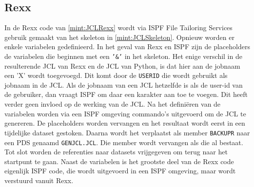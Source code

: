 \subsection{Rexx}
In de Rexx code van \ref{mint:JCLRexx} wordt via ISPF File Tailoring Services gebruik gemaakt van het skeleton in \ref{mint:JCLSkeleton}. Opnieuw worden er enkele variabelen gedefinieerd. In het geval van Rexx en ISPF zijn de placeholders de variabelen die beginnen met een \texttt{'\&'} in het skeleton. Het enige verschil in de resulterende JCL van Rexx en de JCL van Python, is dat hier aan de jobnaam een 'X' wordt toegevoegd. Dit komt door de \texttt{USERID} die wordt gebruikt als jobnaam in de JCL. Als de jobnaam van een JCL hetzelfde is als de user-id van de gebruiker, dan vraagt ISPF om daar een karakter aan toe te voegen. Dit heeft verder geen invloed op de werking van de JCL. Na het definiëren van de variabelen worden via een ISPF omgeving commando's uitgevoerd om de JCL te genereren. De placeholders worden vervangen en het resultaat wordt eerst in een tijdelijke dataset gestoken. Daarna wordt het verplaatst als member \texttt{BACKUPR} naar een PDS genaamd \texttt{GENJCL.JCL}. Die member wordt vervangen als die al bestaat. Tot slot worden de referenties naar datasets vrijgegeven om terug naar het startpunt te gaan. Naast de variabelen is het grootste deel van de Rexx code eigenlijk ISPF code, die wordt uitgevoerd in een ISPF omgeving, maar wordt verstuurd vanuit Rexx.

